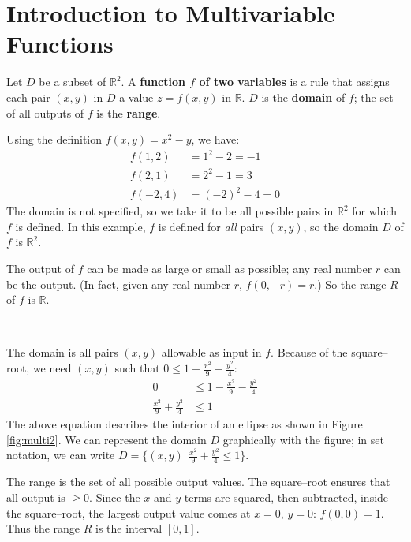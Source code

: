 

\section{Introduction to Multivariable Functions}\label{sec:multi_intro}

{Let $D$ be a subset of $\mathbb{R}^2$. A \textbf{function $f$ of two variables} is a rule that assigns each pair $(x,y)$ in $D$ a value $z=f(x,y)$ in $\mathbb{R}$. $D$ is the \textbf{domain} of $f$; the set of all outputs of $f$ is the \textbf{range}.
}

{Using the definition $f(x,y) = x^2-y$, we have:
\begin{align*}
f(1,2) &= 1^2-2 = -1\\
f(2,1) &=	2^2-1 = 3\\
f(-2,4) &= (-2)^2-4 = 0
\end{align*}
The domain is not specified, so we take it to be all possible pairs in $\mathbb{R}^2$ for which $f$ is defined. In this example, $f$ is defined for \emph{all} pairs $(x,y)$, so the domain $D$ of $f$ is $\mathbb{R}^2$. 
\enlargethispage{2\baselineskip}

The output of $f$ can be made as large or small as possible; any real number $r$ can be the output. (In fact, given any real number $r$, $f(0,-r)=r$.) So the range $R$ of $f$ is $\mathbb{R}$.
}\\

{The domain is all pairs $(x,y)$ allowable as input in $f$. Because of the square--root, we need $(x,y)$ such that $0\leq1-\frac{x^2}9-\frac{y^2}4$:
\begin{align*}
0&\leq1-\frac{x^2}9-\frac{y^2}4\\
\frac{x^2}9+\frac{y^2}4 &\leq 1
\end{align*}
The above equation describes the interior of an ellipse as shown in Figure \ref{fig:multi2}. We can represent the domain $D$ graphically with the figure; in set notation, we can write $D = \{(x,y)|\,\frac{x^2}9+\frac{y^2}4 \leq 1\}$.

The range is the set of all possible output values. The square--root ensures that all output is $\geq 0$. Since the $x$ and $y$ terms are squared, then subtracted, inside the square--root, the largest output value comes at $x=0$, $y=0$: $f(0,0) = 1$. Thus the range $R$ is the interval $[0,1]$.
}\\

